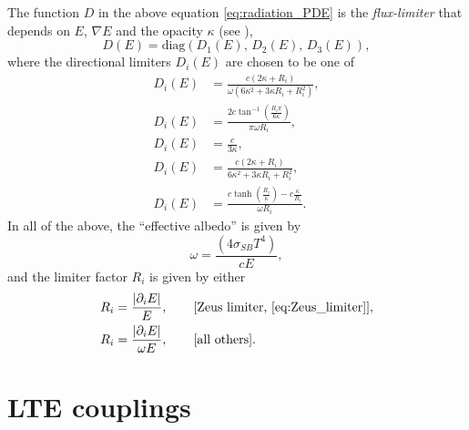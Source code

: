 \documentclass[letterpaper,10pt]{article}
\renewcommand{\(}{\left(}
\renewcommand{\)}{\right)}
\begin{document}
The function $D$ in the above equation \eqref{eq:radiation_PDE} is
the {\em flux-limiter} that depends on $E$, $\nabla E$ and the 
opacity $\kappa$ (see
\cite{HayesNorman2003,ReynoldsHayesPaschosNorman2009}),  
\[
   D(E) = \text{diag}\( D_1(E),\, D_2(E),\, D_3(E) \),
\]
where the directional limiters $D_i(E)$ are chosen to be one of 
\begin{align}
  \label{eq:ratLP_limiter}
   D_i(E) &= \frac{c(2\kappa+R_i)}{\omega(6\kappa^2+3\kappa R_i + R_i^2)}, \\
  \label{eq:Reynolds_limiter}
   D_i(E) &= \frac{2 c \tan^{-1}\left(\frac{R_i \pi}{6 \kappa}\right)}{\pi
     \omega R_i},  \\
  \label{eq:no_limiter}
   D_i(E) &= \frac{c}{3\kappa}, \\
  \label{eq:Zeus_limiter}
   D_i(E) &= \frac{c(2\kappa+R_i)}{6\kappa^2+3\kappa R_i+R_i^2}, \\
  \label{eq:LP_limiter}
   D_i(E) &= \frac{c \tanh\left(\frac{R_i}{\kappa}\right)-c \frac{\kappa}{R_i}}{\omega R_i}.
\end{align}
In all of the above, the ``effective albedo'' is given by
\begin{equation}
\label{eq:albedo}
  \omega = \frac{(4 \sigma_{SB} T^4)}{c E},
\end{equation}
and the limiter factor $R_i$ is given by either
\begin{align}
  \label{eq:R_zeus}
   R_i &= \frac{|\partial_i E|}{E}, \qquad\text{[Zeus limiter,
     \eqref{eq:Zeus_limiter}]},\\ 
   R_i &= \frac{|\partial_i E|}{\omega E}, \qquad\text{[all others]}.
\end{align}



\section{LTE couplings}
\label{sec:lte_model}
\end{document}
